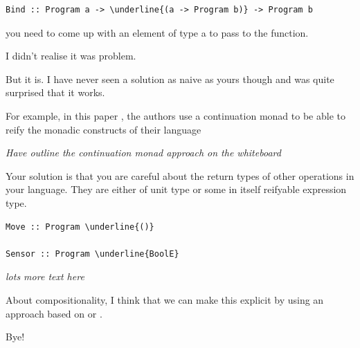 \begin{small}
\begin{Verbatim}[commandchars=\\\{\}] 
Bind :: Program a -> \underline{(a -> Program b)} -> Program b 
\end{Verbatim}
\end{small}


\begin{dialogue}
\speak{\docname{}} you need to come up with an element of type a to pass to the 
function. 

\speak{\studname{}} I didn't realise it was problem. 

\speak{\docname{}} But it is. I have never seen a solution as naive as yours 
though and was quite surprised that it works. 

\speak{\docname{}} For example, in this paper \cite{Generic}, the authors use 
a continuation monad to be able to reify the monadic constructs of their 
language

\end{dialogue}
\emph{Have \docname{} outline the continuation monad approach on the whiteboard}


\begin{dialogue}
\speak{\docname{}} Your solution is that you are careful about the return types 
of other operations in your language. They are either of unit type or some 
in itself reifyable expression type. 

\end {dialogue} 

\begin{small}
\begin{Verbatim}[commandchars=\\\{\}] 
Move :: Program \underline{()}
  
Sensor :: Program \underline{BoolE}
\end{Verbatim}
\end{small}

\emph{lots more text here} 

\begin{dialogue}

\speak{\docname{}} About compositionality, I think that we can make this explicit 
by using an approach based on \cite{Wouter} or \cite{CompData}.

\speak{\docname{}}  Bye!  
\end{dialogue}


